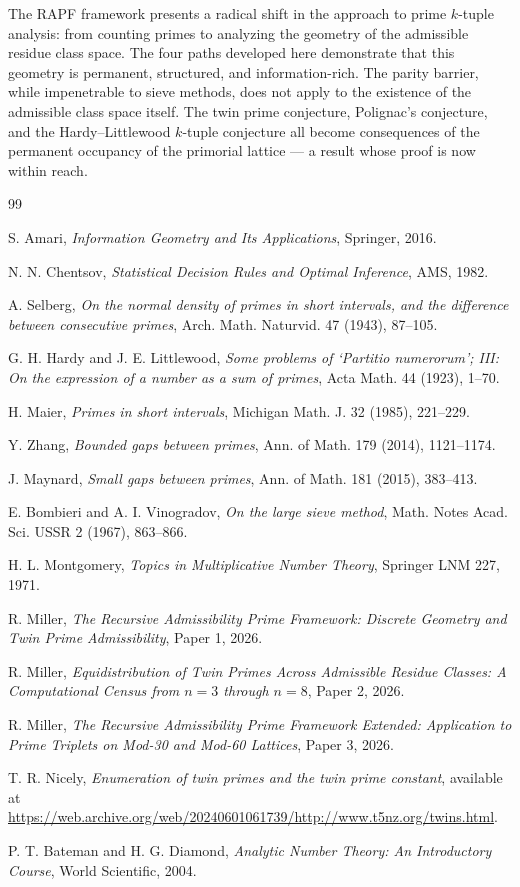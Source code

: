 \documentclass[11pt]{article}
\theoremstyle{remark}
\begin{document}
The RAPF framework presents a radical shift in the approach to prime
$k$-tuple analysis: from counting primes to analyzing the geometry of
the admissible residue class space. The four paths developed here
demonstrate that this geometry is permanent, structured, and
information-rich. The parity barrier, while impenetrable to sieve methods,
does not apply to the existence of the admissible class space itself.
The twin prime conjecture, Polignac's conjecture, and the Hardy--Littlewood
$k$-tuple conjecture all become consequences of the permanent occupancy
of the primorial lattice --- a result whose proof is now within reach.

\begin{thebibliography}{99}

S. Amari, \emph{Information Geometry and Its Applications}, Springer, 2016.

N. N. Chentsov, \emph{Statistical Decision Rules and Optimal Inference},
AMS, 1982.

A. Selberg, \emph{On the normal density of primes in short intervals,
and the difference between consecutive primes}, Arch. Math. Naturvid.
47 (1943), 87--105.

G. H. Hardy and J. E. Littlewood, \emph{Some problems of `Partitio numerorum';
III: On the expression of a number as a sum of primes}, Acta Math. 44 (1923),
1--70.

H. Maier, \emph{Primes in short intervals}, Michigan Math. J. 32 (1985),
221--229.

Y. Zhang, \emph{Bounded gaps between primes}, Ann. of Math. 179 (2014),
1121--1174.

J. Maynard, \emph{Small gaps between primes}, Ann. of Math. 181 (2015),
383--413.

E. Bombieri and A. I. Vinogradov, \emph{On the large sieve method},
Math. Notes Acad. Sci. USSR 2 (1967), 863--866.

H. L. Montgomery, \emph{Topics in Multiplicative Number Theory},
Springer LNM 227, 1971.

R. Miller, \emph{The Recursive Admissibility Prime Framework: Discrete
Geometry and Twin Prime Admissibility}, Paper 1, 2026.

R. Miller, \emph{Equidistribution of Twin Primes Across Admissible
Residue Classes: A Computational Census from $n = 3$ through $n = 8$},
Paper 2, 2026.

R. Miller, \emph{The Recursive Admissibility Prime Framework Extended:
Application to Prime Triplets on Mod-30 and Mod-60 Lattices},
Paper 3, 2026.

T. R. Nicely, \emph{Enumeration of twin primes and the twin prime
constant}, available at
\url{https://web.archive.org/web/20240601061739/http://www.t5nz.org/twins.html}.

P. T. Bateman and H. G. Diamond, \emph{Analytic Number Theory:
An Introductory Course}, World Scientific, 2004.

\end{thebibliography}
\end{document}
